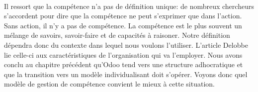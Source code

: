\paragraph{}Il ressort que la compétence n'a pas de définition unique: de nombreux chercheurs s'accordent pour dire que la compétence ne peut s'exprimer que dans l'action. Sans action, il n'y a pas de compétence. La compétence est le plus souvent un mélange de savoirs, savoir-faire et de capacités à raisoner. Notre définition dépendra donc du contexte dans lequel nous voulons l'utiliser. L'article Delobbe\citep[pp.31]{delobbe} lie celle-ci aux caractéristiques de l'organisation qui va l'employer. Nous avons conclu au chapitre précédent qu'Odoo tend vers une structure adhocratique et que la transition vers un modèle individualisant doit s'opérer. Voyons donc quel modèle de gestion de compétence convient le mieux à cette situation.


